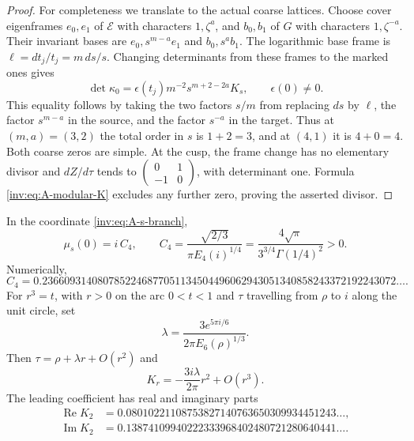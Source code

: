 \begin{proof}
For completeness we translate to the actual coarse lattices.  Choose
cover eigenframes $e_0,e_1$ of $\mathcal E$ with characters
$1,\zeta^a$, and $b_0,b_1$ of $G$ with characters
$1,\zeta^{-a}$.  Their invariant bases are
$e_0,s^{m-a}e_1$ and $b_0,s^ab_1$.  The logarithmic base frame is
$\ell=dt_j/t_j=m\,ds/s$.  Changing determinants from these frames
to the marked ones gives
\[
\det\kappa_0=\epsilon(t_j)m^{-2}s^{m+2-2a}K_s,
\qquad \epsilon(0)\ne0.
\]
This equality follows by taking the two factors $s/m$ from replacing
$ds$ by $\ell$, the factor $s^{m-a}$ in the source, and the factor
$s^{-a}$ in the target.  Thus at $(m,a)=(3,2)$ the total order in
$s$ is $1+2=3$, and at $(4,1)$ it is $4+0=4$.
Both coarse zeros are simple.  At the cusp, the frame change has
no elementary divisor and $dZ/d\tau$ tends to
$\left(\begin{smallmatrix}0&1\\-1&0\end{smallmatrix}\right)$,
with determinant one.  Formula \eqref{inv:eq:A-modular-K} excludes any
further zero, proving the asserted divisor.
\end{proof}

\begin{proposition}\label{inv:A2.2}
In the coordinate \eqref{inv:eq:A-s-branch},
\begin{equation}\label{inv:eq:A-mu-value}
\mu_s(0)=i\,C_4,
\qquad
C_4=\frac{\sqrt{2/3}}{\pi E_4(i)^{1/4}}
=\frac{4\sqrt\pi}{3^{3/4}\Gamma(1/4)^2}>0.
\end{equation}
Numerically,
\[
C_4=0.2366093140807852246877051134504496062943051340858243372192243072\ldots.
\]
For $r^3=t$, with $r>0$ on the arc $0<t<1$ and $\tau$ travelling
from $\rho$ to $i$ along the unit circle, set
\[
\lambda=\frac{3e^{5\pi i/6}}{2\pi E_6(\rho)^{1/3}}.
\]
Then $\tau=\rho+\lambda r+O(r^2)$ and
\[
K_r=-\frac{3i\lambda}{2\pi}r^2+O(r^3).
\]
The leading coefficient has real and imaginary parts
\[
\begin{aligned}
\operatorname{Re}K_2&=0.08010221108753827140763650309934451243\ldots,\\
\operatorname{Im}K_2&=0.13874109940222333968402480721280640441\ldots.
\end{aligned}
\]
\end{proposition}

